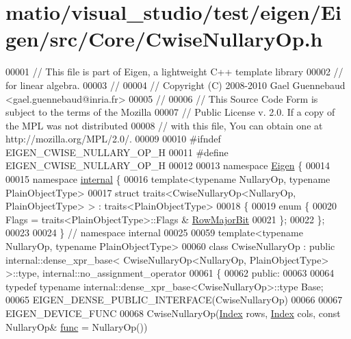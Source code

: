 \hypertarget{matio_2visual__studio_2test_2eigen_2_eigen_2src_2_core_2_cwise_nullary_op_8h_source}{}\section{matio/visual\+\_\+studio/test/eigen/\+Eigen/src/\+Core/\+Cwise\+Nullary\+Op.h}
\label{matio_2visual__studio_2test_2eigen_2_eigen_2src_2_core_2_cwise_nullary_op_8h_source}

\begin{DoxyCode}
00001 \textcolor{comment}{// This file is part of Eigen, a lightweight C++ template library}
00002 \textcolor{comment}{// for linear algebra.}
00003 \textcolor{comment}{//}
00004 \textcolor{comment}{// Copyright (C) 2008-2010 Gael Guennebaud <gael.guennebaud@inria.fr>}
00005 \textcolor{comment}{//}
00006 \textcolor{comment}{// This Source Code Form is subject to the terms of the Mozilla}
00007 \textcolor{comment}{// Public License v. 2.0. If a copy of the MPL was not distributed}
00008 \textcolor{comment}{// with this file, You can obtain one at http://mozilla.org/MPL/2.0/.}
00009 
00010 \textcolor{preprocessor}{#ifndef EIGEN\_CWISE\_NULLARY\_OP\_H}
00011 \textcolor{preprocessor}{#define EIGEN\_CWISE\_NULLARY\_OP\_H}
00012 
00013 \textcolor{keyword}{namespace }\hyperlink{namespace_eigen}{Eigen} \{
00014 
00015 \textcolor{keyword}{namespace }\hyperlink{namespaceinternal}{internal} \{
00016 \textcolor{keyword}{template}<\textcolor{keyword}{typename} NullaryOp, \textcolor{keyword}{typename} PlainObjectType>
00017 \textcolor{keyword}{struct }traits<CwiseNullaryOp<NullaryOp, PlainObjectType> > : traits<PlainObjectType>
00018 \{
00019   \textcolor{keyword}{enum} \{
00020     Flags = traits<PlainObjectType>::Flags & \hyperlink{group__flags_gae4f56c2a60bbe4bd2e44c5b19cbe8762}{RowMajorBit}
00021   \};
00022 \};
00023 
00024 \} \textcolor{comment}{// namespace internal}
00025 
00059 \textcolor{keyword}{template}<\textcolor{keyword}{typename} NullaryOp, \textcolor{keyword}{typename} PlainObjectType>
00060 \textcolor{keyword}{class }CwiseNullaryOp : \textcolor{keyword}{public} internal::dense\_xpr\_base< CwiseNullaryOp<NullaryOp, PlainObjectType> >::type,
       internal::no\_assignment\_operator
00061 \{
00062   \textcolor{keyword}{public}:
00063 
00064     \textcolor{keyword}{typedef} \textcolor{keyword}{typename} internal::dense\_xpr\_base<CwiseNullaryOp>::type Base;
00065     EIGEN\_DENSE\_PUBLIC\_INTERFACE(CwiseNullaryOp)
00066 
00067     EIGEN\_DEVICE\_FUNC
00068     CwiseNullaryOp(\hyperlink{namespace_eigen_a62e77e0933482dafde8fe197d9a2cfde}{Index} rows, \hyperlink{namespace_eigen_a62e77e0933482dafde8fe197d9a2cfde}{Index} cols, \textcolor{keyword}{const} NullaryOp& \hyperlink{structfunc}{func} = NullaryOp())

\end{DoxyCode}
